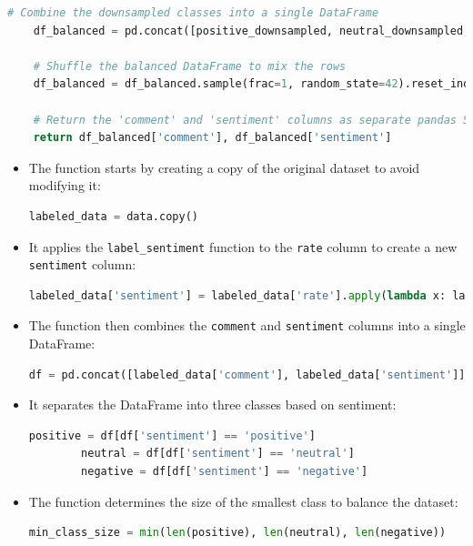 \documentclass{solutionclass} %
\begin{document}
\begin{lstlisting}[language=Python]
    # Combine the downsampled classes into a single DataFrame
    df_balanced = pd.concat([positive_downsampled, neutral_downsampled, negative_downsampled])

    # Shuffle the balanced DataFrame to mix the rows
    df_balanced = df_balanced.sample(frac=1, random_state=42).reset_index(drop=True)
    
    # Return the 'comment' and 'sentiment' columns as separate pandas Series
    return df_balanced['comment'], df_balanced['sentiment']
\end{lstlisting}

\begin{solution}
\begin{itemize}
	\item The function starts by creating a copy of the original dataset to avoid modifying it:
	\begin{lstlisting}[language=Python]
		labeled_data = data.copy()
	\end{lstlisting}
	
	\item It applies the \texttt{label\_sentiment} function to the \texttt{rate} column to create a new \texttt{sentiment} column:
	\begin{lstlisting}[language=Python]
		labeled_data['sentiment'] = labeled_data['rate'].apply(lambda x: label_sentiment(x, positive_threshold, neutral_threshold))
	\end{lstlisting}
	
	\item The function then combines the \texttt{comment} and \texttt{sentiment} columns into a single DataFrame:
	\begin{lstlisting}[language=Python]
		df = pd.concat([labeled_data['comment'], labeled_data['sentiment']], axis=1)
	\end{lstlisting}
	
	\item It separates the DataFrame into three classes based on sentiment:
	\begin{lstlisting}[language=Python]
		positive = df[df['sentiment'] == 'positive']
		neutral = df[df['sentiment'] == 'neutral']
		negative = df[df['sentiment'] == 'negative']
	\end{lstlisting}
	
	\item The function determines the size of the smallest class to balance the dataset:
	\begin{lstlisting}[language=Python]
		min_class_size = min(len(positive), len(neutral), len(negative))
	\end{lstlisting}
	

\end{itemize}
\end{solution}
\end{document}
